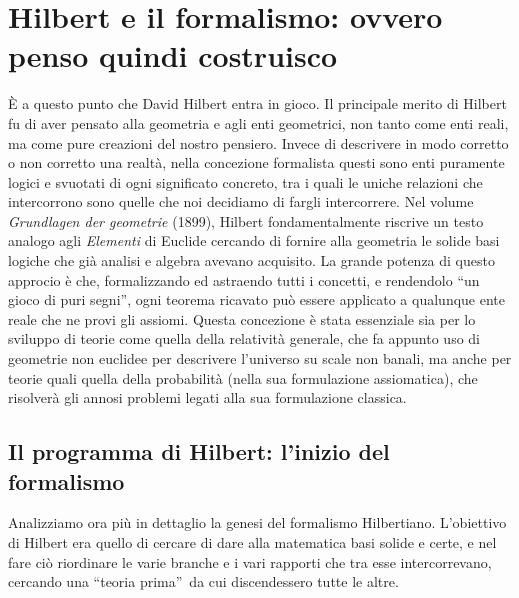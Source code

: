 \documentclass[a4paper,10pt]{article}
\begin{document}
\section{Hilbert e il formalismo: ovvero penso quindi costruisco}
È a questo punto che David Hilbert entra in gioco.
Il principale merito di Hilbert fu di aver pensato alla geometria e agli enti geometrici, non tanto come enti reali, ma come pure creazioni del nostro pensiero. Invece di descrivere in modo corretto o non corretto una realtà, nella concezione formalista questi sono enti puramente logici e svuotati di ogni significato concreto, tra i quali le uniche relazioni che intercorrono sono quelle che noi decidiamo di fargli intercorrere.
Nel volume \textit{Grundlagen der geometrie} \cite{grundlagen} (1899), Hilbert fondamentalmente riscrive un testo analogo agli \textit{Elementi} di Euclide cercando di fornire alla geometria le solide basi logiche che già analisi e algebra avevano acquisito.
La grande potenza di questo approcio è che, formalizzando ed astraendo tutti i concetti, e rendendolo “un gioco di puri segni”, ogni teorema ricavato può essere applicato a qualunque ente reale che ne provi gli assiomi. Questa concezione è stata essenziale sia per lo sviluppo di teorie come quella della relatività generale, che fa appunto uso di geometrie non euclidee per descrivere l'universo su scale non banali, ma anche per teorie quali quella della probabilità (nella sua formulazione assiomatica), che risolverà gli annosi problemi legati alla sua formulazione classica.


\subsection[L'inizio del formalismo]{Il programma di Hilbert: l'inizio del formalismo}
Analizziamo ora più in dettaglio la genesi del formalismo Hilbertiano.
L'obiettivo di Hilbert era quello di cercare di dare alla matematica basi solide e certe, e nel fare ciò riordinare le varie branche e i vari rapporti che tra esse intercorrevano, cercando una \textquotedblleft teoria prima\textquotedblright\ da cui discendessero tutte le altre.
\end{document}
